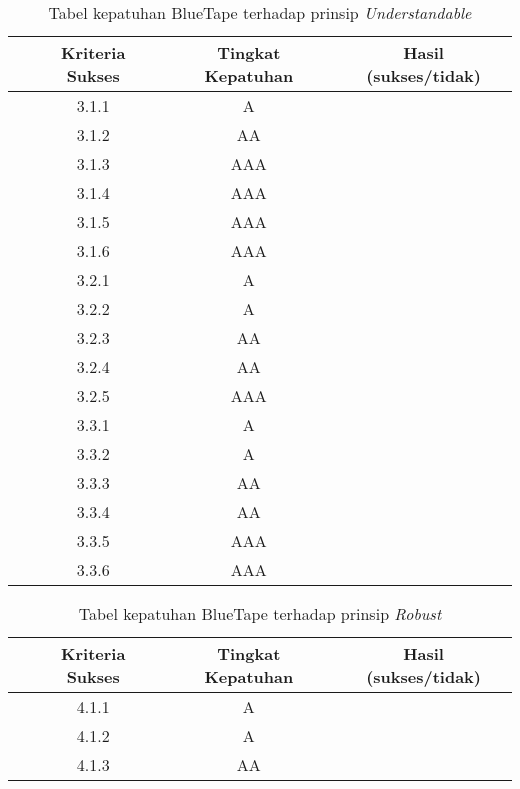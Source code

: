 \begin{table}[H]
    \centering 
    \caption{Tabel kepatuhan BlueTape terhadap prinsip \textit{Understandable}}
    \label{tab:kepatuhan_bluetape_understandable}
    \begin{tabular}{cccc}
        \toprule
        & Kriteria Sukses & Tingkat Kepatuhan & Hasil (sukses/tidak)\\

        \midrule
        & 3.1.1 & A & \\
        & 3.1.2 & AA & \\
        & 3.1.3 & AAA & \\
        & 3.1.4 & AAA & \\
        & 3.1.5 & AAA & \\
        & 3.1.6 & AAA & \\
        & 3.2.1 & A & \\
        & 3.2.2 & A & \\
        & 3.2.3 & AA & \\
        & 3.2.4 & AA & \\
        & 3.2.5 & AAA & \\
        & 3.3.1 & A & \\
        & 3.3.2 & A & \\
        & 3.3.3 & AA & \\
        & 3.3.4 & AA & \\
        & 3.3.5 & AAA & \\
        & 3.3.6 & AAA & \\

        \bottomrule

    \end{tabular}
\end{table}
\begin{table}[H]
    \centering 
    \caption{Tabel kepatuhan BlueTape terhadap prinsip \textit{Robust}}
    \label{tab:kepatuhan_bluetape_robust}
    \begin{tabular}{cccc}
        \toprule
        & Kriteria Sukses & Tingkat Kepatuhan & Hasil (sukses/tidak)\\

        \midrule
        & 4.1.1 & A & \\
        & 4.1.2 & A & \\
        & 4.1.3 & AA & \\

        \bottomrule
    
    \end{tabular} 
\end{table}

